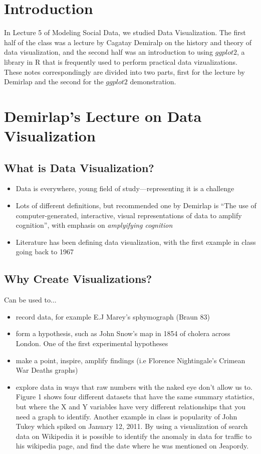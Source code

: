 
\section{Introduction}
In Lecture 5 of Modeling Social Data, we studied Data Visualization. The first half of the class was a lecture by Cagatay Demiralp on the history and theory of data visualization, and the second half was an introduction to using $ggplot2$, a library in R that is frequently used to perform practical data vizualizations. These notes correspondingly are divided into two parts, first for the lecture by Demirlap and the second for the $ggplot2$ demonstration. 

\section{Demirlap's Lecture on Data Visualization}

\subsection{What is Data Visualization?}
\begin{itemize}
  \item Data is everywhere, young field of study---representing it is a challenge
  \item Lots of different definitions, but recommended one by Demirlap is ``The use of computer-generated, interactive, visual representations of data to amplify cognition'', with emphasis on {\it amplyifying cognition}
  \item Literature has been defining data visualization, with the first example in class going back to 1967
\end{itemize}

\subsection{Why Create Visualizations?}
Can be used to...
\begin{itemize}
  \item record data, for example E.J Marey's sphymograph (Braun 83)
  \item form a hypothesis, such as John Snow's map in 1854 of cholera across London. One of the first experimental hypotheses
  \item make a point, inspire, amplify findings (i.e Florence Nightingale's Crimean War Deaths graphs)
  \item explore data in ways that raw numbers with the naked eye don't allow us to. Figure 1 shows four different datasets that have the same summary statistics, but where the X and Y variables have very different relationships that you need a graph to identify. Another example in class is popularity of John Tukey which spiked on January 12, 2011. By using a visualization of search data on Wikipedia it is possible to identify the anomaly in data for traffic to his wikipedia page, and find the date where he was mentioned on Jeapordy. 
\end{itemize}

